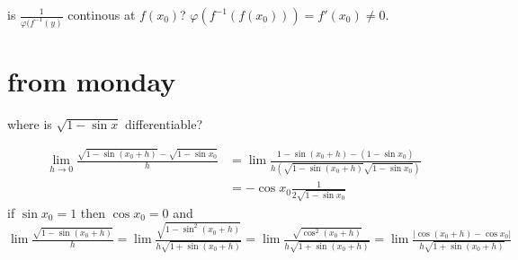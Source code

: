 \documentclass[letterpaper]{article}
\begin{document}
is $\frac{1}{\varphi(f^{-1}(y)}$ continous at $f(x_0)$? $\varphi(f^{-1}(f(x_0)))=f'(x_0)\ne 0$.

\section*{from monday}
where is $\sqrt{1-\sin x}$ differentiable?

\begin{align*}
  \lim_{h\to0}\frac{\sqrt{1-\sin(x_0+h)}-\sqrt{1-\sin x_0}}{h}
  &=\lim\frac{1-\sin(x_0+h)-(1-\sin x_0)}{h(\sqrt{1-\sin(x_0+h)}\sqrt{1-\sin x_0})}\\
  &=-\cos x_0\frac{1}{2\sqrt{1-\sin x_0}}
\end{align*}
if $\sin x_0=1$ then $\cos x_0=0$ and $\lim\frac{\sqrt{1-\sin(x_0+h)}}{h}=\lim\frac{ \sqrt{1-\sin^2(x_0+h)}}{h\sqrt{1+\sin(x_0+h)}}=\lim\frac{\sqrt{\cos^2(x_0+h)}}{h\sqrt{1+\sin(x_0+h)}}=\lim\frac{\left\lvert\cos(x_0+h)-\cos x_0\right\rvert}{h\sqrt{1+\sin(x_0+h)}}$
\end{document}

